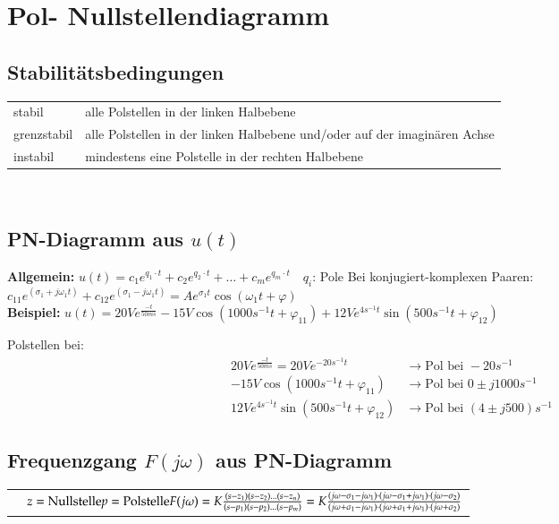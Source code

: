 \section{Pol- Nullstellendiagramm}
\subsection{Stabilitätsbedingungen}
\begin{tabular}{ll}
	stabil & alle Polstellen in der linken Halbebene\\
	grenzstabil & alle Polstellen in der linken Halbebene und/oder auf der
	imaginären Achse\\
	instabil & mindestens eine Polstelle in der rechten Halbebene
\end{tabular}\\

\subsection{PN-Diagramm aus $u(t)$}

\newline
\textbf{Allgemein:} \newline
$u(t)=c_1 e^{q_1 \cdot t}+c_2 e^{q_2\cdot t}+\ldots+c_m e^{q_m \cdot t}\quad
q_i$: Pole\newline 
Bei konjugiert-komplexen Paaren: $c_{11}e^{(\sigma_1+j\omega_1
t)}+c_{12}e^{(\sigma_1-j\omega_1 t)}=Ae^{\sigma_1 t}\cos{(\omega_1
t+\varphi)}$\\
\textbf{Beispiel:} \newline
$u(t)=20Ve^{\frac{-t}{50ms}}-15V\cos(1000s^{-1}t+\varphi_{11})+12Ve^{4s^{-1}t}\sin(500s^{-1}t+\varphi_{12})$

Polstellen bei: \\
\begin{align}
	20Ve^{\frac{-t}{50ms}} = 20Ve^{-20s^{-1}t} &\rightarrow \text{Pol bei }
	-20s^{-1}\nonumber\\
	-15V\cos(1000s^{-1}t+\varphi_{11}) &\rightarrow \text{Pol bei }
	0\pm j1000s^{-1}\nonumber\\
	12Ve^{4s^{-1}t}\sin(500s^{-1}t+\varphi_{12}) &\rightarrow \text{Pol bei } (4\pm
	j500)s^{-1}\nonumber
\end{align}


\subsection{Frequenzgang $F(j\omega)$ aus PN-Diagramm}
\begin{tabular}{cp{12cm}}
\parbox[c][5cm]{5.3cm}{}
& $z =\text{Nullstelle}\newline
p=\text{Polstelle}\newline
F(j\omega)=K\frac{(s-z_1)(s-z_2)\ldots(s-z_n)}{(s-p_1)(s-p_2)\ldots
(s-p_m)}=K\frac{(j\omega-\sigma_1-j\omega_1)\cdot(j\omega-\sigma_1+j\omega_1)\cdot(j\omega-\sigma_2)}{(j\omega+\sigma_1-j\omega_1)\cdot(j\omega+\sigma_1+j\omega_1)\cdot(j\omega+\sigma_2)}$
\end{tabular}

